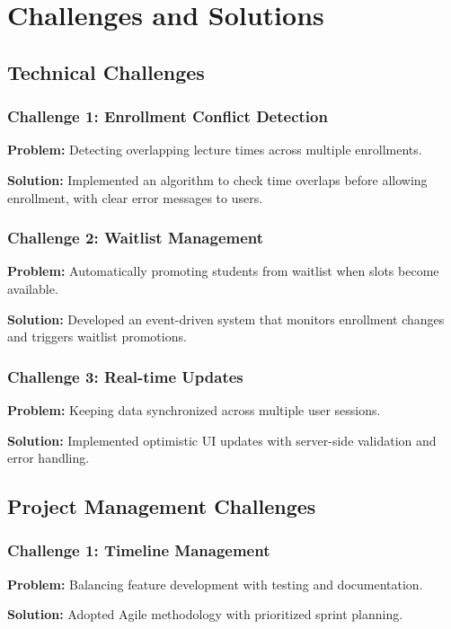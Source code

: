 \documentclass[12pt,a4paper]{report}
\begin{document}
\chapter{Challenges and Solutions}

\section{Technical Challenges}

\subsection{Challenge 1: Enrollment Conflict Detection}
\textbf{Problem:} Detecting overlapping lecture times across multiple enrollments.

\textbf{Solution:} Implemented an algorithm to check time overlaps before allowing enrollment, with clear error messages to users.

\subsection{Challenge 2: Waitlist Management}
\textbf{Problem:} Automatically promoting students from waitlist when slots become available.

\textbf{Solution:} Developed an event-driven system that monitors enrollment changes and triggers waitlist promotions.

\subsection{Challenge 3: Real-time Updates}
\textbf{Problem:} Keeping data synchronized across multiple user sessions.

\textbf{Solution:} Implemented optimistic UI updates with server-side validation and error handling.

\section{Project Management Challenges}

\subsection{Challenge 1: Timeline Management}
\textbf{Problem:} Balancing feature development with testing and documentation.

\textbf{Solution:} Adopted Agile methodology with prioritized sprint planning.
\end{document}
